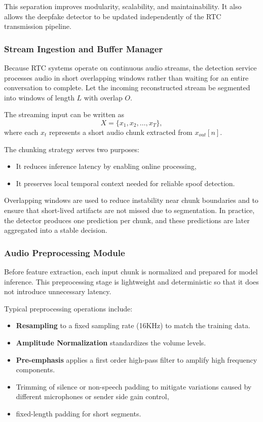 This separation improves modularity, scalability, and maintainability. It also allows the deepfake detector to be updated independently of the RTC transmission pipeline.

\subsubsection{Stream Ingestion and Buffer Manager}

Because RTC systems operate on continuous audio streams, the detection service processes audio in short overlapping windows rather than waiting for an entire conversation to complete. Let the incoming reconstructed stream be segmented into windows of length \(L\) with overlap \(O\).

The streaming input can be written as
\begin{equation}
X = \{x_1, x_2, \ldots, x_T\},
\end{equation}
where each \(x_t\) represents a short audio chunk extracted from \(x_{out}[n]\).

The chunking strategy serves two purposes:
\begin{itemize}
    \item It reduces inference latency by enabling online processing,
    \item It preserves local temporal context needed for reliable spoof detection.
\end{itemize}

Overlapping windows are used to reduce instability near chunk boundaries and to ensure that short-lived artifacts are not missed due to segmentation. In practice, the detector produces one prediction per chunk, and these predictions are later aggregated into a stable decision.

\subsubsection{Audio Preprocessing Module}

Before feature extraction, each input chunk is normalized and prepared for model inference. This preprocessing stage is lightweight and deterministic so that it does not introduce unnecessary latency.

Typical preprocessing operations include:
\begin{itemize}
    \item \textbf{Resampling} to a fixed sampling rate (16KHz) to match the training data.
    \item \textbf{Amplitude Normalization} standardizes the volume levels.
    \item \textbf{Pre-emphasis} applies a first order high-pass filter to amplify high frequency components.
    \item Trimming of silence or non-speech padding to mitigate variations caused by different microphones or sender side gain control,
    \item fixed-length padding for short segments.
\end{itemize}

